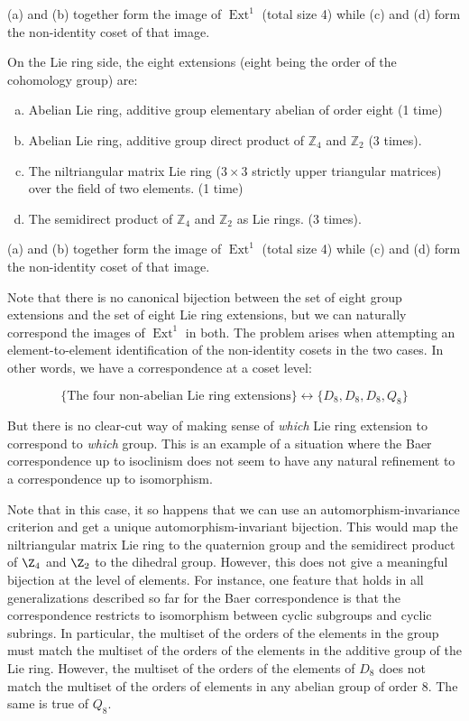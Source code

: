 \documentclass{ucetd}
\begin{document}
(a) and (b) together form the image of $\operatorname{Ext}^1$ (total
size 4) while (c) and (d) form the non-identity coset of that
image.

On the Lie ring side, the eight extensions (eight being the order of the cohomology group) are:

\begin{enumerate}[(a)]
\item Abelian Lie ring, additive group elementary abelian of order eight (1 time)
\item Abelian Lie ring, additive group direct product of
  $\mathbb{Z}_4$ and $\mathbb{Z}_2$ (3 times).
\item The niltriangular matrix Lie ring ($3 \times 3$ strictly upper
  triangular matrices) over the field of two elements. (1 time)
\item The semidirect product of $\mathbb{Z}_4$ and $\mathbb{Z}_2$ as
  Lie rings. (3 times).
\end{enumerate}

(a) and (b) together form the image of $\operatorname{Ext}^1$ (total
size 4) while (c) and (d) form the non-identity coset of that
image.

Note that there is no canonical bijection between the set of eight
group extensions and the set of eight Lie ring extensions, but we can
naturally correspond the images of $\operatorname{Ext}^1$ in both. The
problem arises when attempting an element-to-element identification of the
non-identity cosets in the two cases. In other words, we have a
correspondence at a coset level:

$$\{ \text{The four non-abelian Lie ring extensions} \} \leftrightarrow \{ D_8, D_8, D_8, Q_8 \}$$

But there is no clear-cut way of making sense of {\em which} Lie ring
extension to correspond to {\em which} group. This is an example of a
situation where the Baer correspondence up to isoclinism does not seem
to have any natural refinement to a correspondence up to isomorphism.

Note that in this case, it so happens that we can use an
automorphism-invariance criterion and get a unique
automorphism-invariant bijection. This would map the niltriangular
matrix Lie ring to the quaternion group and the semidirect product of
$\Z_4$ and $\Z_2$ to the dihedral group. However, this does not give a
meaningful bijection at the level of elements. For instance, one
feature that holds in all generalizations described so far for the
Baer correspondence is that the correspondence restricts to
isomorphism between cyclic subgroups and cyclic subrings. In
particular, the multiset of the orders of the elements in the group
must match the multiset of the orders of the elements in the additive
group of the Lie ring. However, the multiset of the orders of the
elements of $D_8$ does not match the multiset of the orders of
elements in any abelian group of order $8$. The same is true of $Q_8$.
\end{document}

